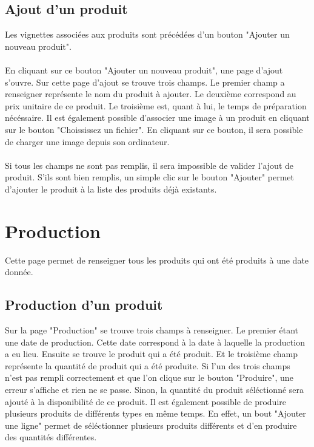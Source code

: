 \subsection{Ajout d'un produit}
Les vignettes associées aux produits sont précédées d'un bouton "Ajouter un 
nouveau produit".

\paragraph{}
En cliquant sur ce bouton "Ajouter un nouveau produit", une page d'ajout s'ouvre.
Sur cette page d'ajout se trouve trois champs. Le premier champ a renseigner 
représente le nom du produit à ajouter. Le deuxième correspond au prix unitaire 
de ce produit. Le troisième est, quant à lui, le temps de préparation nécéssaire.
Il est également possible d'associer une image à un produit en cliquant sur le 
bouton "Choississez un fichier". En cliquant sur ce bouton, il sera possible de 
charger une image depuis son ordinateur.

\paragraph{}
Si tous les champs ne sont pas remplis, il sera impossible de valider l'ajout de 
produit. S'ils sont bien remplis, un simple clic sur le bouton "Ajouter" 
permet d'ajouter le produit à la liste des produits déjà existants. 



\section{Production}
Cette page permet de renseigner tous les produits qui ont été produits à une date 
donnée.

\subsection{Production d'un produit}
Sur la page "Production" se trouve trois champs à renseigner. Le premier étant 
une date de production. Cette date correspond à la date à laquelle la production 
a eu lieu. Ensuite se trouve le produit qui a été produit. Et le troisième champ 
représente la quantité de produit qui a été produite. Si l'un des trois champs 
n'est pas rempli correctement et que l'on clique sur le bouton "Produire", une 
erreur s'affiche et rien ne se passe. Sinon, la quantité du produit séléctionné 
sera ajouté à la disponibilité de ce produit. Il est également possible de 
produire plusieurs produits de différents types en même temps. En effet, un 
bout "Ajouter une ligne" permet de séléctionner plusieurs produits différents 
et d'en produire des quantités différentes.
